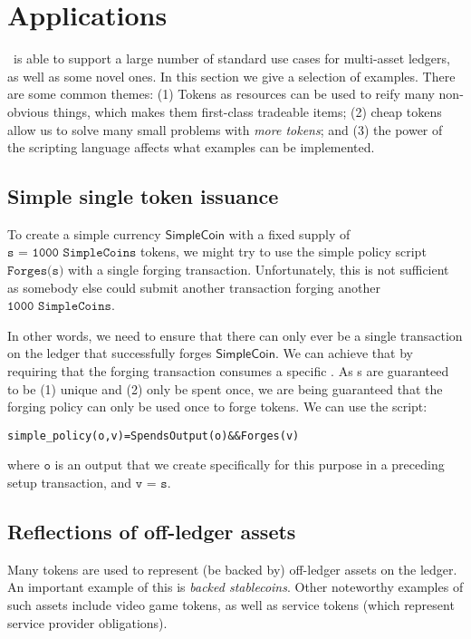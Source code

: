 \section{Applications}
\label{sec:applications}

\UTXOma\ is able to support a large number of standard use cases for multi-asset ledgers, as well as some novel ones.
In this section we give a selection of examples.
There are some common themes: (1) Tokens as resources can be used to reify many non-obvious things, which makes them first-class tradeable items; (2) cheap tokens allow us to solve many small problems with \emph{more tokens}; and (3) the power of the scripting language affects what examples can be implemented.

\subsection{Simple single token issuance}
%
To create a simple currency $\mathsf{SimpleCoin}$ with a fixed supply of $\texttt{s = 1000 SimpleCoins}$ tokens, we might try to use the simple policy script $\texttt{Forges(s)}$ with a single forging transaction. Unfortunately, this is not sufficient as somebody else could submit another transaction forging another $\texttt{1000 SimpleCoins}$.

In other words, we need to ensure that there can only ever be a single transaction on the ledger that successfully forges $\mathsf{SimpleCoin}$. We can achieve that by requiring that the forging transaction consumes a specific \UTXO. As \UTXO{}s are guaranteed to be (1) unique and (2) only be spent once, we are being guaranteed that the forging policy can only be used once to forge tokens. We can use the script:

\begin{alltt}
  simple_policy(o, v) = SpendsOutput(o) && Forges(v)
\end{alltt}

\noindent where $\texttt{o}$ is an output that we create specifically for this purpose in a preceding setup transaction, and $\texttt{v = s}$.

\subsection{Reflections of off-ledger assets}
\label{sec:asset-tokens}

Many tokens are used to represent (be backed by) off-ledger assets on the ledger. An
important example of this is \emph{backed stablecoins}. Other noteworthy
examples of such assets include video game tokens, as well as service
tokens (which represent service provider obligations).

